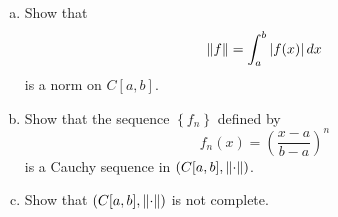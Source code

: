 \documentclass[10pt]{amsart}
\begin{document}
\begin{ex25}{}
	\begin{enumerate}[(a)]
		\item\label{25a}
			Show that 
			$$\lVert f\rVert = \int_a^b \left| f(x) \right|dx$$
			is a norm on $C[a,b]$.
		\item\label{25b}
			Show that the sequence $\left\{f_n\right\}$ defined by 
				$$f_n(x) = \left(\frac{x-a}{b-a}\right)^n$$
			is a Cauchy sequence in $(C[a,b], \lVert\cdot\rVert)$.
		\item\label{25c}
			Show that $(C[a,b], \lVert\cdot\rVert)$ is not complete.
	\end{enumerate}
\end{ex25}{}
\end{document}
